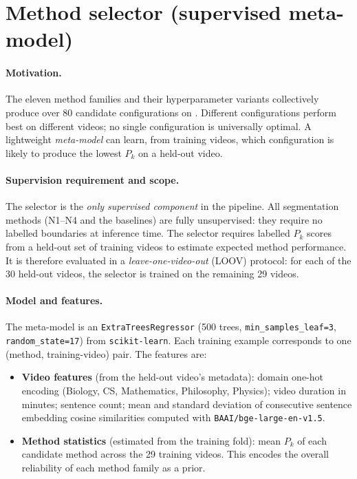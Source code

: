 \section{Method selector (supervised meta-model)}
\label{sec:selector}

\paragraph{Motivation.}
The eleven method families and their hyperparameter variants collectively
produce over 80 candidate configurations on \dataset{}.
Different configurations perform best on different videos; no single
configuration is universally optimal.
A lightweight \emph{meta-model} can learn, from training videos, which
configuration is likely to produce the lowest $P_k$ on a held-out video.

\paragraph{Supervision requirement and scope.}
The selector is the \emph{only supervised component} in the \lecseg{}
pipeline.
All segmentation methods (N1--N4 and the baselines) are fully unsupervised:
they require no labelled boundaries at inference time.
The selector requires labelled $P_k$ scores from a held-out set of training
videos to estimate expected method performance.
It is therefore evaluated in a \emph{leave-one-video-out} (LOOV) protocol:
for each of the 30 held-out videos, the selector is trained on the remaining
29 videos.

\paragraph{Model and features.}
The meta-model is an \texttt{ExtraTreesRegressor} (500 trees,
\texttt{min\_samples\_leaf=3}, \texttt{random\_state=17})
from \texttt{scikit-learn}.
Each training example corresponds to one (method, training-video) pair.
The features are:

\begin{itemize}
  \item \textbf{Video features} (from the held-out video's metadata):
    domain one-hot encoding (Biology, CS, Mathematics, Philosophy, Physics);
    video duration in minutes; sentence count; mean and standard deviation of
    consecutive sentence embedding cosine similarities computed with
    \texttt{BAAI/bge-large-en-v1.5}.
  \item \textbf{Method statistics} (estimated from the training fold):
    mean $P_k$ of each candidate method across the 29 training videos.
    This encodes the overall reliability of each method family as a prior.
\end{itemize}

